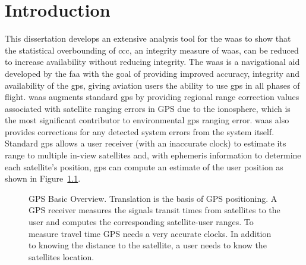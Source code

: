 \acresetall
\chapter{Introduction}
\label{chapter:introduction}

This dissertation develops an extensive analysis tool for the \ac{waas} to show that the statistical overbounding of \ac{ccc}, an integrity measure of \ac{waas}, can be reduced to increase availability without reducing integrity. The \ac{waas} is a navigational aid developed by the \ac{faa} with the goal of providing improved accuracy, integrity and availability of the \ac{gps}, giving aviation users the ability to use \ac{gps} in all phases of flight.  \ac{waas} augments standard \ac{gps} by providing regional range correction values associated with satellite ranging errors in GPS due to the ionosphere, which is the most significant contributor to environmental \ac{gps} ranging error.  \ac{waas} also provides corrections for any detected system errors from the system itself.  Standard \ac{gps} allows a user receiver (with an inaccurate clock) to estimate its range to multiple in-view satellites and, with ephemeris information to determine each satellite's position, \ac{gps} can compute an estimate of the user position as shown in Figure~\ref{fig:GPS-Basic-Overview}.

\begin{figure}
	\centering
	\caption{GPS Basic Overview. Translation is the basis of GPS positioning. A GPS receiver measures the signals transit times from satellites to the user and computes the corresponding satellite-user ranges. To measure travel time GPS needs a very accurate clocks. In addition to knowing the distance to the satellite, a user needs to know the satellites location.
  }
	\label{fig:GPS-Basic-Overview}
\end{figure}

